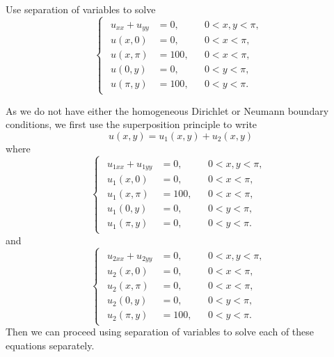 \documentclass[plain]{pset}
\begin{document}
\begin{problem}
Use separation of variables to solve
\[
    \begin{cases}
        \begin{aligned}
            u_{xx} + u_{yy} & = 0,   &  & 0 < x, y < \pi, \\
            u(x, 0)         & = 0,   &  & 0 < x < \pi,    \\
            u(x, \pi)       & = 100, &  & 0 < x < \pi,    \\
            u(0, y)         & = 0,   &  & 0 < y < \pi,    \\
            u(\pi, y)       & = 100, &  & 0 < y < \pi.
        \end{aligned}
    \end{cases}
\]
\end{problem}
\begin{solution}
    As we do not have either the homogeneous Dirichlet or Neumann boundary conditions, we first use the superposition principle to write
    \[u(x, y) = u_1(x, y) + u_2(x, y)\]
    where
    \[
        \begin{cases}
            \begin{aligned}
                u_{1xx} + u_{1yy} & = 0,   &  & 0 < x, y < \pi, \\
                u_1(x, 0)         & = 0,   &  & 0 < x < \pi,    \\
                u_1(x, \pi)       & = 100, &  & 0 < x < \pi,    \\
                u_1(0, y)         & = 0,   &  & 0 < y < \pi,    \\
                u_1(\pi, y)       & = 0,   &  & 0 < y < \pi.
            \end{aligned}
        \end{cases}
    \]
    and
    \[
        \begin{cases}
            \begin{aligned}
                u_{2xx} + u_{2yy} & = 0,   &  & 0 < x, y < \pi, \\
                u_2(x, 0)         & = 0,   &  & 0 < x < \pi,    \\
                u_2(x, \pi)       & = 0,   &  & 0 < x < \pi,    \\
                u_2(0, y)         & = 0,   &  & 0 < y < \pi,    \\
                u_2(\pi, y)       & = 100, &  & 0 < y < \pi.
            \end{aligned}
        \end{cases}
    \]
    Then we can proceed using separation of variables to solve each of these equations separately.


\end{solution}
\end{document}
